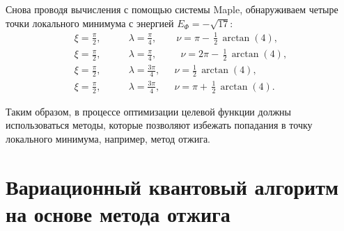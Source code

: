 \documentclass[a4paper]{report}
\begin{document}
Снова проводя вычисления с помощью системы Maple, обнаруживаем четыре точки локального минимума с энергией ${E_\Phi=-\sqrt{17}}$:
\begin{align*}
\xi=\frac{\pi}{2}, &\qquad\lambda=\frac{\pi}{4}, \qquad \nu=\pi-\,\frac{1}{2}\,\arctan(4),\\
\xi=\frac{\pi}{2}, &\qquad\lambda=\frac{\pi}{4}, \qquad\:\! \!\!\:\nu=2\pi-\,\frac{1}{2}\,\arctan(4),\\
\xi=\frac{\pi}{2}, &\qquad\lambda=\frac{3\pi}{4}, \quad\;\, \nu=\frac{1}{2}\,\arctan(4),\\
\xi=\frac{\pi}{2}, &\qquad\lambda=\frac{3\pi}{4}, \quad\;\, \nu=\pi+\,\frac{1}{2}\,\arctan(4).
\end{align*}

Таким образом, в процессе оптимизации целевой функции должны использоваться методы, которые позволяют избежать попадания в точку локального минимума, например, метод отжига.



\chapter{Вариационный квантовый алгоритм на основе метода отжига}

\end{document}
